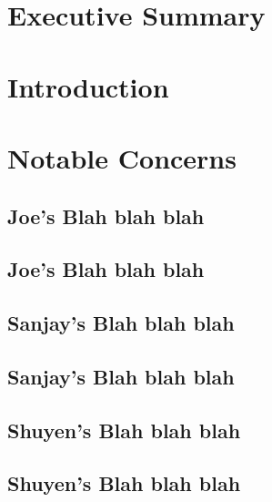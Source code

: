 \documentclass{article}
\begin{document}

\setcounter{tocdepth}{2}
\tableofcontents
\newpage
\listoftables
\listoffigures
\newpage


\section*{Executive Summary}
\label{sec:exec-summary}



\newpage


\section{Introduction}
\label{sec:introduction}



\section{Notable Concerns}
\label{sec:concerns}



\subsection{Joe's Blah blah blah}
\label{sec:blah-blah-blah}

\subsection{Joe's Blah blah blah}
\label{sec:blah-blah-blah}

\subsection{Sanjay's Blah blah blah}
\label{sec:blah-blah-blah}

\subsection{Sanjay's Blah blah blah}
\label{sec:blah-blah-blah}

\subsection{Shuyen's Blah blah blah}
\label{sec:blah-blah-blah}

\subsection{Shuyen's Blah blah blah}
\label{sec:blah-blah-blah}
\end{document}
